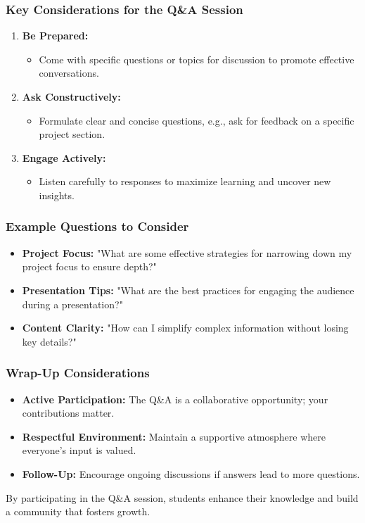 \documentclass[aspectratio=169]{beamer}
\begin{document}
\begin{frame}[fragile]
    \frametitle{Key Considerations for the Q\&A Session}
    \begin{enumerate}
        \item \textbf{Be Prepared:} 
        \begin{itemize}
            \item Come with specific questions or topics for discussion to promote effective conversations.
        \end{itemize}

        \item \textbf{Ask Constructively:}
        \begin{itemize}
            \item Formulate clear and concise questions, e.g., ask for feedback on a specific project section.
        \end{itemize}

        \item \textbf{Engage Actively:}
        \begin{itemize}
            \item Listen carefully to responses to maximize learning and uncover new insights.
        \end{itemize}
    \end{enumerate}
\end{frame}

\begin{frame}[fragile]
    \frametitle{Example Questions to Consider}
    \begin{itemize}
        \item \textbf{Project Focus:} "What are some effective strategies for narrowing down my project focus to ensure depth?"
        \item \textbf{Presentation Tips:} "What are the best practices for engaging the audience during a presentation?"
        \item \textbf{Content Clarity:} "How can I simplify complex information without losing key details?"
    \end{itemize}
\end{frame}

\begin{frame}[fragile]
    \frametitle{Wrap-Up Considerations}
    \begin{itemize}
        \item \textbf{Active Participation:} The Q\&A is a collaborative opportunity; your contributions matter.
        \item \textbf{Respectful Environment:} Maintain a supportive atmosphere where everyone's input is valued.
        \item \textbf{Follow-Up:} Encourage ongoing discussions if answers lead to more questions.
    \end{itemize}
    By participating in the Q\&A session, students enhance their knowledge and build a community that fosters growth.
\end{frame}
\end{document}
